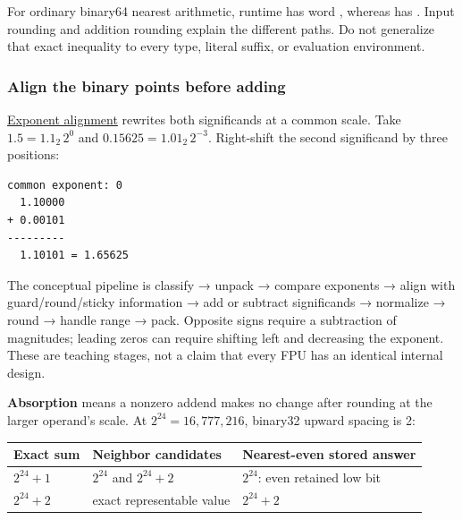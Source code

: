 For ordinary binary64 nearest arithmetic, runtime  has word , whereas  has . Input rounding and addition rounding explain the different paths. Do not generalize that exact inequality to every type, literal suffix, or evaluation environment.

\subsubsection{Align the binary points before adding}\label{01-foundations-i-ch001-align-the-binary-points-before-adding}

\hypertarget{01-foundations-i-ch001-align-the-binary-points-before-adding}{}

\hyperref[appendix-a1b1b4580dfd]{Exponent alignment} rewrites both significands at a common scale. Take \(1.5=1.1_2\,2^0\) and \(0.15625=1.01_2\,2^{-3}\). Right-shift the second significand by three positions:

\begin{verbatim}
common exponent: 0
  1.10000
+ 0.00101
---------
  1.10101 = 1.65625
\end{verbatim}

The conceptual pipeline is classify → unpack → compare exponents → align with guard/round/sticky information → add or subtract significands → normalize → round → handle range → pack. Opposite signs require a subtraction of magnitudes; leading zeros can require shifting left and decreasing the exponent. These are teaching stages, not a claim that every FPU has an identical internal design.

\textbf{Absorption} means a nonzero addend makes no change after rounding at the larger operand's scale. At \(2^{24}=16{,}777{,}216\), binary32 upward spacing is 2:

{\def\LTcaptype{none} %
\begin{longtable}[]{@{}
  >{\raggedright\arraybackslash}p{}
  >{\raggedright\arraybackslash}p{}
  >{\raggedright\arraybackslash}p{}@{}}
\toprule\noalign{}
\begin{minipage}[b]{\linewidth}\raggedright
Exact sum
\end{minipage} & \begin{minipage}[b]{\linewidth}\raggedright
Neighbor candidates
\end{minipage} & \begin{minipage}[b]{\linewidth}\raggedright
Nearest-even stored answer
\end{minipage} \\
\midrule\noalign{}
\endhead
\bottomrule\noalign{}
\endlastfoot
\(2^{24}+1\) & \(2^{24}\) and \(2^{24}+2\) & \(2^{24}\): even retained low bit \\
\(2^{24}+2\) & exact representable value & \(2^{24}+2\) \\
\end{longtable}
}

